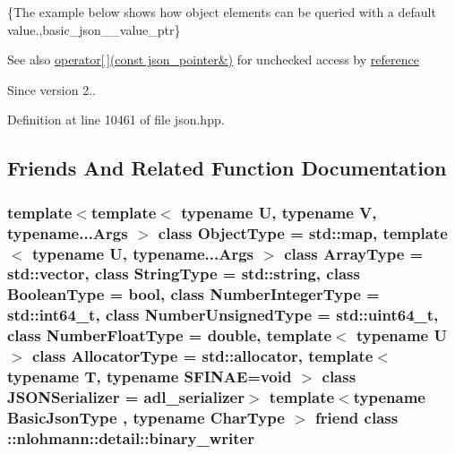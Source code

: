 \{The example below shows how object elements can be queried with a default value.,basic\+\_\+json\+\_\+\+\_\+value\+\_\+ptr\}

\begin{DoxySeeAlso}{See also}
\hyperlink{classnlohmann_1_1basic__json_ac6946dffeb3be5aa173645f0467a44b3}{operator\mbox{[}$\,$\mbox{]}(const json\+\_\+pointer\&)} for unchecked access by \hyperlink{classnlohmann_1_1basic__json_ac6a5eddd156c776ac75ff54cfe54a5bc}{reference}
\end{DoxySeeAlso}
\begin{DoxySince}{Since}
version 2.. 
\end{DoxySince}


Definition at line 10461 of file json.\+hpp.



\subsection{Friends And Related Function Documentation}
\subsubsection[{\texorpdfstring{\+::nlohmann\+::detail\+::binary\+\_\+writer}{::nlohmann::detail::binary_writer}}]{\setlength{\rightskip}{0pt plus 5cm}template$<$template$<$ typename U, typename V, typename...\+Args $>$ class Object\+Type = std\+::map, template$<$ typename U, typename...\+Args $>$ class Array\+Type = std\+::vector, class String\+Type  = std\+::string, class Boolean\+Type  = bool, class Number\+Integer\+Type  = std\+::int64\+\_\+t, class Number\+Unsigned\+Type  = std\+::uint64\+\_\+t, class Number\+Float\+Type  = double, template$<$ typename U $>$ class Allocator\+Type = std\+::allocator, template$<$ typename T, typename S\+F\+I\+N\+A\+E=void $>$ class J\+S\+O\+N\+Serializer = adl\+\_\+serializer$>$ template$<$typename Basic\+Json\+Type , typename Char\+Type $>$ friend class \+::{\bf nlohmann\+::detail\+::binary\+\_\+writer}\hspace{0.3cm}{\ttfamily [friend]}}\hypertarget{classnlohmann_1_1basic__json_a69d491bbda88ade6d3c7a2b11309e8bf}{}\label{classnlohmann_1_1basic__json_a69d491bbda88ade6d3c7a2b11309e8bf}


